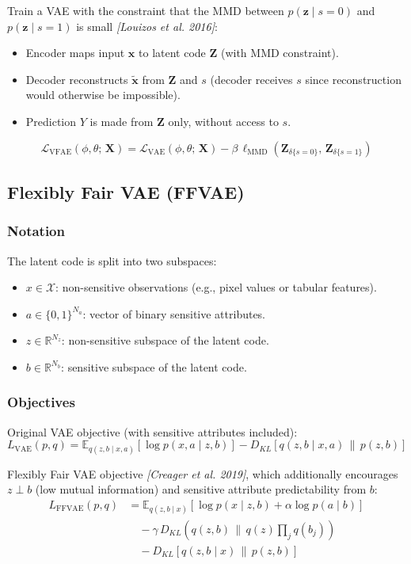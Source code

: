 \documentclass[UTF8]{ctexart}
\begin{document}
Train a VAE with the constraint that the MMD between $p(\mathbf{z} \mid s=0)$ and $p(\mathbf{z} \mid s=1)$ is small \textit{[Louizos et al. 2016]}:
\begin{itemize}
    \item Encoder maps input $\mathbf{x}$ to latent code $\mathbf{Z}$ (with MMD constraint).
    \item Decoder reconstructs $\tilde{\mathbf{x}}$ from $\mathbf{Z}$ and $s$ (decoder receives $s$ since reconstruction would otherwise be impossible).
    \item Prediction $Y$ is made from $\mathbf{Z}$ only, without access to $s$.
\end{itemize}
\[
    \mathcal{L}_{\mathrm{VFAE}}(\phi, \theta;\, \mathbf{X}) = \mathcal{L}_{\mathrm{VAE}}(\phi, \theta;\, \mathbf{X}) - \beta\,\ell_{\mathrm{MMD}}\!\left(\mathbf{Z}_{\delta\{s=0\}},\, \mathbf{Z}_{\delta\{s=1\}}\right)
\]

\subsection{Flexibly Fair VAE (FFVAE)}

\subsubsection{Notation}

The latent code is split into two subspaces:
\begin{itemize}
    \item $x \in \mathcal{X}$: non-sensitive observations (e.g., pixel values or tabular features).
    \item $a \in \{0,1\}^{N_a}$: vector of binary sensitive attributes.
    \item $z \in \mathbb{R}^{N_z}$: non-sensitive subspace of the latent code.
    \item $b \in \mathbb{R}^{N_b}$: sensitive subspace of the latent code.
\end{itemize}

\subsubsection{Objectives}

Original VAE objective (with sensitive attributes included):
\[
    L_{\mathrm{VAE}}(p,q) = \mathbb{E}_{q(z,b\mid x,a)}\!\left[\log p(x,a \mid z,b)\right] - D_{KL}\!\left[q(z,b\mid x,a)\,\|\,p(z,b)\right]
\]

Flexibly Fair VAE objective \textit{[Creager et al. 2019]}, which additionally encourages $z \perp b$ (low mutual information) and sensitive attribute predictability from $b$:
\begin{align*}
    L_{\mathrm{FFVAE}}(p,q) &= \mathbb{E}_{q(z,b\mid x)}\!\left[\log p(x \mid z,b) + \alpha \log p(a \mid b)\right] \\
    &\quad - \gamma\, D_{KL}\!\left(q(z,b)\,\Big\|\,q(z)\prod_{j} q(b_j)\right) \\
    &\quad - D_{KL}\!\left[q(z,b\mid x)\,\|\,p(z,b)\right]
\end{align*}
\end{document}
